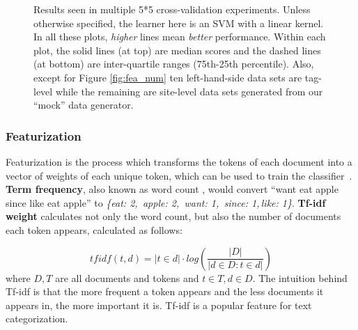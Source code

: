 \documentclass{sig-alternate-05-2015}
\theoremstyle{break}
\begin{document}
\begin{figure}
{        \label{fig:balance}
    }
    \quad
    \quad
    \caption{Results seen in multiple 5*5 cross-validation experiments. Unless
    otherwise specified, the learner here is an SVM with a linear kernel.
    In all these plots, {\em higher} lines mean {\em better} performance.
    Within each plot,  the solid lines (at top) are median scores and 
    the dashed lines (at bottom) are inter-quartile ranges (75th-25th percentile). Also, except for Figure \ref{fig:fea_num} ten left-hand-side data sets are tag-level while the remaining are site-level data sets generated from
    our ``mock'' data generator.
    }
    \label{fig:all}
\end{figure}


\subsubsection{Featurization}

Featurization is the process which transforms the tokens of each document into a vector of weights of each unique token, which can be used to train the classifier~\cite{manning1999foundations}. 
\textbf{Term frequency}, also known as word count \cite{manning1999foundations}, would convert ``want eat apple since like eat apple'' to
{\em \{eat: 2,\, apple: 2,\, want: 1,\, since: 1,\,like: 1\}}.
\textbf{Tf-idf weight }calculates not only the word count, but also the number of documents each token appears, calculated as follows:

\begin{equation}\label{eq:tfidf}
\mathit{tfidf}(t, d) = |t  \in d| \cdot  log\left(\frac{|D|}{|d\in D: t\in d|}\right)
\end{equation}
where $D,T$ are all documents and tokens and $t\in T,d\in D$.
The intuition behind  Tf-idf   is that the more frequent a token appears and the less documents it appears in, the more important it is. Tf-idf  is  a popular feature for text categorization\cite{caropreso2001learner,moharanatag}. 
\end{document}
